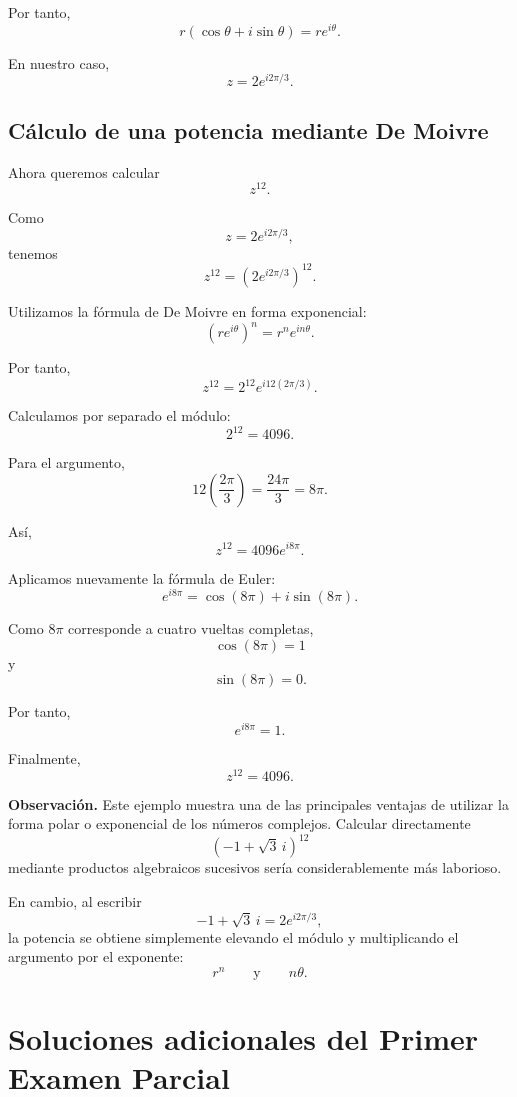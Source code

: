 Por tanto,
\[
r(\cos\theta+i\sin\theta)
=
re^{i\theta}.
\]

En nuestro caso,
\[
\boxed{
z
=
2e^{i2\pi/3}
}.
\]

\subsection{Cálculo de una potencia mediante De Moivre}

Ahora queremos calcular
\[
z^{12}.
\]

Como
\[
z
=
2e^{i2\pi/3},
\]
tenemos
\[
z^{12}
=
\left(
2e^{i2\pi/3}
\right)^{12}.
\]

Utilizamos la fórmula de De Moivre en forma exponencial:
\[
\boxed{
\left(re^{i\theta}\right)^n
=
r^n e^{in\theta}
}.
\]

Por tanto,
\[
z^{12}
=
2^{12}
e^{i12(2\pi/3)}.
\]

Calculamos por separado el módulo:
\[
2^{12}=4096.
\]

Para el argumento,
\[
12\left(\frac{2\pi}{3}\right)
=
\frac{24\pi}{3}
=
8\pi.
\]

Así,
\[
z^{12}
=
4096e^{i8\pi}.
\]

Aplicamos nuevamente la fórmula de Euler:
\[
e^{i8\pi}
=
\cos(8\pi)+i\sin(8\pi).
\]

Como $8\pi$ corresponde a cuatro vueltas completas,
\[
\cos(8\pi)=1
\]
y
\[
\sin(8\pi)=0.
\]

Por tanto,
\[
e^{i8\pi}
=
1.
\]

Finalmente,
\[
\boxed{
z^{12}=4096
}.
\]

\medskip

\noindent
\textbf{Observación.}
Este ejemplo muestra una de las principales ventajas de utilizar
la forma polar o exponencial de los números complejos. Calcular
directamente
\[
(-1+\sqrt{3}\,i)^{12}
\]
mediante productos algebraicos sucesivos sería considerablemente
más laborioso.

En cambio, al escribir
\[
-1+\sqrt{3}\,i
=
2e^{i2\pi/3},
\]
la potencia se obtiene simplemente elevando el módulo y
multiplicando el argumento por el exponente:
\[
r^n
\qquad\text{y}\qquad
n\theta.
\]

\section{Soluciones adicionales del Primer Examen Parcial}


